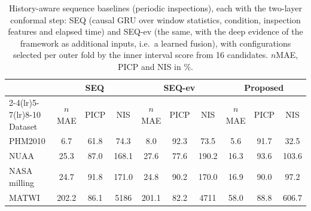 \begin{table}[!htbp]
\centering
\caption{History-aware sequence baselines (periodic inspections), each with the two-layer conformal step: SEQ (causal GRU over window statistics, condition, inspection features and elapsed time) and SEQ-ev (the same, with the deep evidence of the framework as additional inputs, i.e.\ a learned fusion), with configurations selected per outer fold by the inner interval score from 16 candidates. $n$MAE, PICP and NIS in \%.}
\label{tab:Sseq}
\footnotesize\setlength{\tabcolsep}{3pt}
\begin{tabular}{lccccccccc}
\toprule
 & \multicolumn{3}{c}{SEQ} & \multicolumn{3}{c}{SEQ-ev} & \multicolumn{3}{c}{Proposed}\\
\cmidrule(lr){2-4}\cmidrule(lr){5-7}\cmidrule(lr){8-10}
Dataset & $n$MAE & PICP & NIS & $n$MAE & PICP & NIS & $n$MAE & PICP & NIS\\
\midrule
PHM2010 & 6.7 & 61.8 & 74.3 & 8.0 & 92.3 & 73.5 & 5.6 & 91.7 & 32.5\\
NUAA & 25.3 & 87.0 & 168.1 & 27.6 & 77.6 & 190.2 & 16.3 & 93.6 & 103.6\\
NASA milling & 24.7 & 91.8 & 171.0 & 24.8 & 90.2 & 170.0 & 16.9 & 90.0 & 97.2\\
MATWI & 202.2 & 86.1 & 5186 & 201.1 & 82.2 & 4711 & 58.0 & 88.8 & 606.7\\
\bottomrule
\end{tabular}
\end{table}
